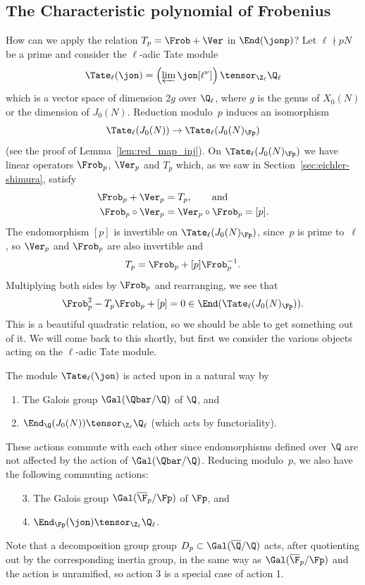 \documentclass{report}
\begin{document}
\subsection{The Characteristic polynomial of Frobenius}
How can we apply the relation $T_p=\Frob+\Ver$ in $\End(\jonp)$?
Let $\ell\nmid pN$ be a prime and
consider the $\ell$-adic Tate module
\[
 \Tate_{\ell}(\jon)=\left(\varprojlim\jon[\ell^{\nu}]\right)
 \tensor_{\Z_{\ell}}\Q_{\ell}
\]
which is a vector space of dimension $2g$ over $\Q_{\ell}$,
where $g$ is the genus of $X_0(N)$ or the dimension of $J_0(N)$.
Reduction modulo~$p$ induces an isomorphism
\[
  \Tate_{\ell}(J_0(N)) \to \Tate_{\ell}(J_0(N)_{\Fp})
\]
(see the proof of Lemma~\ref{lem:red_map_inj}).
On $\Tate_{\ell}(J_0(N)_\Fp)$ we have linear
operators $\Frob_p$, $\Ver_p$ and $T_p$ which, as we
saw in Section~\ref{sec:eichler-shimura}, satisfy
\begin{align*}
\Frob_p+\Ver_p&=T_p,\qquad\text{and}\\
  \Frob_p\circ\Ver_p&=\Ver_p\circ\Frob_p=[p].
\end{align*}
The endomorphism $[p]$ is invertible on $\Tate_{\ell}(J_0(N)_{\Fp})$,
since~$p$ is prime to~$\ell$, so $\Ver_p$ and $\Frob_p$ are also
invertible and
\[
  T_p=\Frob_p+[p]\Frob_p^{-1}.
\]
Multiplying both sides by $\Frob_p$ and rearranging, we see that
\[
  \Frob_p^2-T_p\Frob_p+[p]=0 \in \End(\Tate_{\ell}(J_0(N)_{\Fp})).
\]
This is a beautiful quadratic relation, so we should be able to get
something out of it.  We will come back to this shortly, but first we
consider the various objects acting on the $\ell$-adic Tate module.

The module $\Tate_{\ell}(\jon)$ is acted upon in a natural way by
\begin{enumerate}
\item The Galois group $\Gal(\Qbar/\Q)$ of $\Q$, and
\item $\End_{\Q}(J_0(N))\tensor_{\Z_{\ell}}\Q_{\ell}$ (which acts
by functoriality).
\end{enumerate}
These actions commute with each other since endomorphisms defined
over $\Q$ are not affected by the action of $\Gal(\Qbar/\Q)$.
Reducing modulo~$p$, we also have the following commuting actions:
\begin{enumerate}
\item[3.] The Galois group $\Gal(\overline{\F}_p/\Fp)$ of $\Fp$, and
\item[4.] $\End_{\Fp}(\jon)\tensor_{\Z_{\ell}}\Q_{\ell}$.
\end{enumerate}
Note that a decomposition group group $D_p\subset\Gal(\overline{\Q}/\Q)$
acts, after quotienting out by the corresponding inertia group, in the
same way as $\Gal(\overline{\F}_p/\Fp)$ and the action is unramified,
so action 3 is a special case of action 1.
\end{document}
